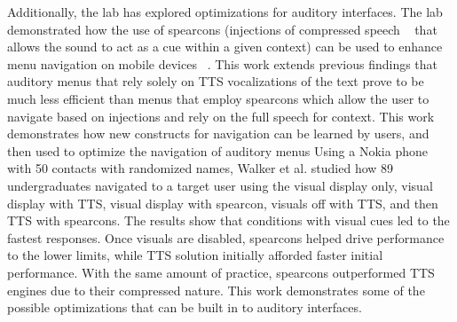 Additionally, the lab has explored optimizations for auditory interfaces. The
lab demonstrated how the use of spearcons (injections of compressed speech
~\cite{ jeon2009enhanced} that allows the sound to act as a cue within a given
context) can be used to enhance menu navigation on mobile devices ~\cite{
walker2009spearcon}. This work extends previous findings that auditory menus
that rely solely on TTS vocalizations of the text prove to be much less
efficient than menus that employ spearcons which allow the user to navigate
based on injections and rely on the full speech for context. This work
demonstrates how new constructs for navigation can be learned by users, and then
used to optimize the navigation of auditory menus Using a Nokia phone with 50
contacts with randomized names, Walker et al. studied how 89 undergraduates
navigated to a target user using the visual display only, visual display with
TTS, visual display with spearcon, visuals off with TTS, and then TTS with
spearcons. The results show that conditions with visual cues led to the fastest
responses. Once visuals are disabled, spearcons helped drive performance to the
lower limits, while TTS solution initially afforded faster initial performance.
With the same amount of practice, spearcons outperformed TTS engines due to
their compressed nature. This work demonstrates some of the possible
optimizations that can be built in to auditory interfaces.
